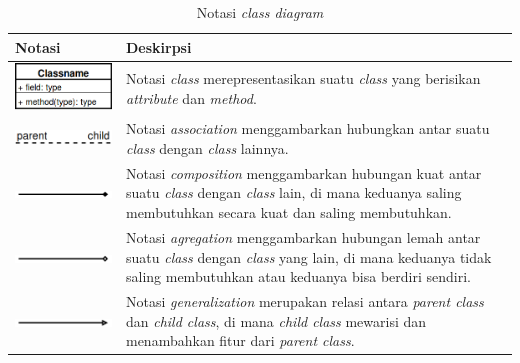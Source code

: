 \begin{longtable}{|>{\centering}m{5cm}|m{7cm}|}
  \caption{Notasi \emph{class diagram}}\label{tab:notasi-class-diargam}\\
  \hline \textbf{Notasi} & \textbf{Deskirpsi} \\\hline
  \includegraphics[width=.44\linewidth]{img/uml-notation/class}
                         & Notasi \emph{class} merepresentasikan suatu
                           \emph{class} yang berisikan
                           \emph{attribute} dan \emph{method}.\\\hline
  \includegraphics[width=.6\linewidth]{img/uml-notation/association-class}
                         & Notasi \emph{association} menggambarkan
                           hubungkan antar suatu \emph{class} dengan
                           \emph{class} lainnya. \\\hline
  \includegraphics[width=.6\linewidth]{img/uml-notation/composition-class}
                         & Notasi \emph{composition} menggambarkan
                           hubungan kuat antar suatu \emph{class} dengan
                           \emph{class} lain, di mana keduanya
                           saling membutuhkan secara kuat dan saling
                           membutuhkan. \\\hline
  \includegraphics[width=.6\linewidth]{img/uml-notation/agregation-class}
                         & Notasi \emph{agregation} menggambarkan
                           hubungan lemah antar suatu \emph{class}
                           dengan \emph{class} yang lain, di mana
                           keduanya tidak saling membutuhkan atau keduanya bisa
                           berdiri sendiri. \\\hline
  \includegraphics[width=.6\linewidth]{img/uml-notation/generalization-class}
                         & Notasi \emph{generalization}
                           merupakan relasi antara \emph{parent class}
                           dan \emph{child class}, di mana \emph{child class}
                           mewarisi dan menambahkan fitur dari
                           \emph{parent class}. \\\hline
\end{longtable}

